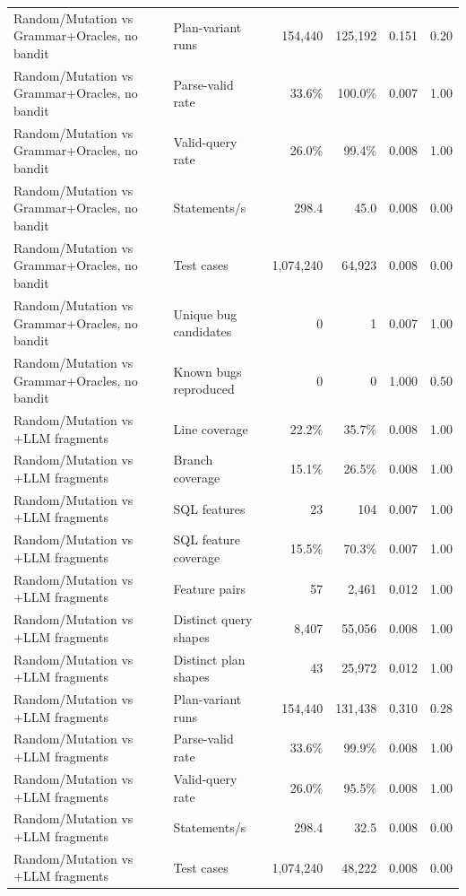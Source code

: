 \begin{table}[t]
\begin{tabular}{llrrrr}
    Random/Mutation vs Grammar+Oracles, no bandit & Plan-variant runs & 154{,}440 & 125{,}192 & 0.151 & 0.20 \\
    Random/Mutation vs Grammar+Oracles, no bandit & Parse-valid rate & 33.6\% & 100.0\% & 0.007 & 1.00 \\
    Random/Mutation vs Grammar+Oracles, no bandit & Valid-query rate & 26.0\% & 99.4\% & 0.008 & 1.00 \\
    Random/Mutation vs Grammar+Oracles, no bandit & Statements/s & 298.4 & 45.0 & 0.008 & 0.00 \\
    Random/Mutation vs Grammar+Oracles, no bandit & Test cases & 1{,}074{,}240 & 64{,}923 & 0.008 & 0.00 \\
    Random/Mutation vs Grammar+Oracles, no bandit & Unique bug candidates & 0 & 1 & 0.007 & 1.00 \\
    Random/Mutation vs Grammar+Oracles, no bandit & Known bugs reproduced & 0 & 0 & 1.000 & 0.50 \\
    Random/Mutation vs +LLM fragments & Line coverage & 22.2\% & 35.7\% & 0.008 & 1.00 \\
    Random/Mutation vs +LLM fragments & Branch coverage & 15.1\% & 26.5\% & 0.008 & 1.00 \\
    Random/Mutation vs +LLM fragments & SQL features & 23 & 104 & 0.007 & 1.00 \\
    Random/Mutation vs +LLM fragments & SQL feature coverage & 15.5\% & 70.3\% & 0.007 & 1.00 \\
    Random/Mutation vs +LLM fragments & Feature pairs & 57 & 2{,}461 & 0.012 & 1.00 \\
    Random/Mutation vs +LLM fragments & Distinct query shapes & 8{,}407 & 55{,}056 & 0.008 & 1.00 \\
    Random/Mutation vs +LLM fragments & Distinct plan shapes & 43 & 25{,}972 & 0.012 & 1.00 \\
    Random/Mutation vs +LLM fragments & Plan-variant runs & 154{,}440 & 131{,}438 & 0.310 & 0.28 \\
    Random/Mutation vs +LLM fragments & Parse-valid rate & 33.6\% & 99.9\% & 0.008 & 1.00 \\
    Random/Mutation vs +LLM fragments & Valid-query rate & 26.0\% & 95.5\% & 0.008 & 1.00 \\
    Random/Mutation vs +LLM fragments & Statements/s & 298.4 & 32.5 & 0.008 & 0.00 \\
    Random/Mutation vs +LLM fragments & Test cases & 1{,}074{,}240 & 48{,}222 & 0.008 & 0.00 \\

\end{tabular}
\end{table}
